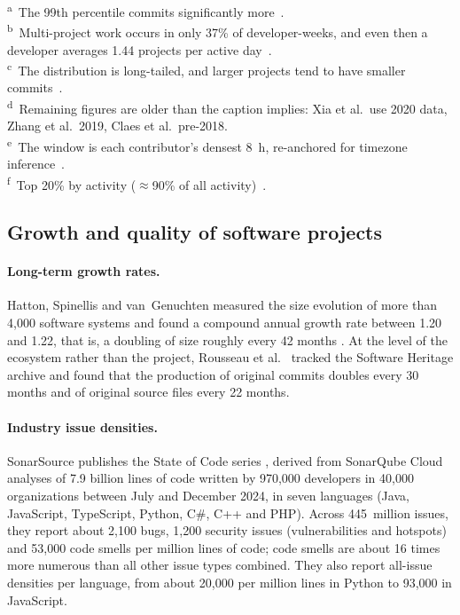 \documentclass[smallextended]{svjour3}
\begin{document}
\begin{table}[tbp]
\smallskip
\begin{minipage}{\textwidth}
\scriptsize
\textsuperscript{a}~The 99th percentile commits significantly more~\cite{gitclear2024git}.\\
\textsuperscript{b}~Multi-project work occurs in only 37\% of developer-weeks, and even then a developer averages 1.44 projects per active day~\cite{Vasilescu2016sky}.\\
\textsuperscript{c}~The distribution is long-tailed, and larger projects tend to have smaller commits~\cite{kolassa2013model}.\\
\textsuperscript{d}~Remaining figures are older than the caption implies: Xia et al.\ use 2020 data, Zhang et al.\ 2019, Claes et al.\ pre-2018.\\
\textsuperscript{e}~The window is each contributor's densest 8~h, re-anchored for timezone inference~\cite{claes2018night}.\\
\textsuperscript{f}~Top 20\% by activity (${\approx}$90\% of all activity)~\cite{xia2022exploring}.\\
\end{minipage}
\end{table}

\subsection{Growth and quality of software projects}
\paragraph{Long-term growth rates.}
Hatton, Spinellis and van~Genuchten measured the size evolution of
more than 4{,}000 software systems and found a compound annual growth
rate between 1.20 and 1.22, that is, a doubling of size roughly every
42 months \cite{hatton2017growth}. At the level of the ecosystem
rather than the project, Rousseau et al.~\cite{rousseau2019growth} tracked the Software
Heritage archive and found that the production of original commits
doubles every 30 months and of original source files every 22 months.

\paragraph{Industry issue densities.}
SonarSource publishes the State of Code series
\cite{sonar2025stateofcode}, derived from SonarQube Cloud analyses of
7.9 billion lines of code written by 970{,}000 developers in 40{,}000
organizations between July and December 2024, in seven languages
(Java, JavaScript, TypeScript, Python, C\#, C++ and PHP). Across
445~million issues, they report about 2{,}100 bugs, 1{,}200 security
issues (vulnerabilities and hotspots) and 53{,}000 code smells per
million lines of code; code smells are about 16 times more numerous
than all other issue types combined. They also report
all-issue densities per language, from about 20{,}000 per million
lines in Python to 93{,}000 in JavaScript.
\end{document}
